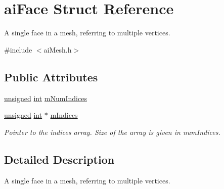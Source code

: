 \hypertarget{structai_face}{\section{ai\-Face Struct Reference}
\label{structai_face}
}


A single face in a mesh, referring to multiple vertices.  




{\ttfamily \#include $<$ai\-Mesh.\-h$>$}

\subsection*{Public Attributes}
\begin{DoxyCompactItemize}
\item 
\hyperlink{_free_image_8h_a425076c7067a1b5166e2cc530e914814}{unsigned} \hyperlink{wglew_8h_a500a82aecba06f4550f6849b8099ca21}{int} \hyperlink{structai_face_adda2698cec0ebfe651572f4a5701360b}{m\-Num\-Indices}
\item 
\hyperlink{_free_image_8h_a425076c7067a1b5166e2cc530e914814}{unsigned} \hyperlink{wglew_8h_a500a82aecba06f4550f6849b8099ca21}{int} $\ast$ \hyperlink{structai_face_a2026b434c40cf1636f9f464a592ec36c}{m\-Indices}
\begin{DoxyCompactList}\small\item\em Pointer to the indices array. Size of the array is given in num\-Indices. \end{DoxyCompactList}\end{DoxyCompactItemize}


\subsection{Detailed Description}
A single face in a mesh, referring to multiple vertices. 

